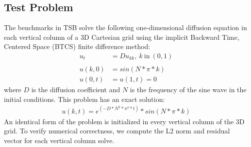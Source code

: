 \documentclass{sig-alternate-05-2015}
\begin{document}
\subsection{Test Problem}
\label{sec:experimental_setup:test_problem}

The benchmarks in TSB solve the following one-dimensional diffusion equation in
  each vertical column of a 3D Cartesian grid using the implicit Backward Time,
  Centered Space (BTCS) finite difference method:
\begin{align*}
u_t &= Du_{kk}, \: k \: \text{in} \: (0, 1) \\
                                          \\
u(k, 0) &= sin(N * \pi * k)               \\
u(0, t) &= u(1, t) = 0
\end{align*}
where \(D\) is the diffusion coefficient and \(N\) is the frequency of the sine
  wave in the initial conditions.
This problem has an exact solution:
\begin{align*}
u(k, t) = e^{(-D * N^2 * \pi^2 * t)} * sin(N * \pi * k)
\end{align*}
An identical form of the problem is initialized in every vertical column of the
  3D grid.
To verify numerical correctness, we compute the L2 norm and residual vector for
  each vertical column solve.


\end{document}
